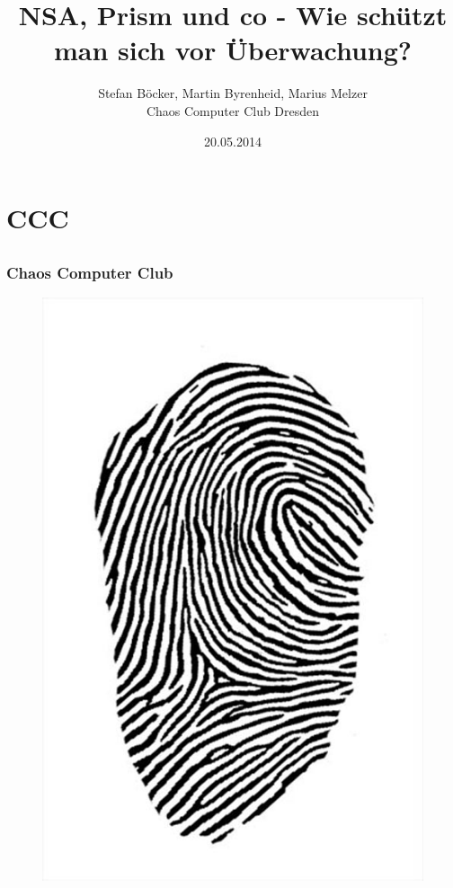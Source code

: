 \documentclass[12pt]{beamer}
\title{NSA, Prism und co - Wie schützt man sich vor Überwachung?}
\author{\small Stefan Böcker, Martin Byrenheid, Marius Melzer\\\large Chaos Computer Club Dresden}
\date{20.05.2014}
\begin{document}
\maketitle

\section{CCC}
\subsection{}

\begin{frame}
  \frametitle{Chaos Computer Club}
  \begin{figure}
    \includegraphics[height=0.7\textheight]{img/fingerabdruck.jpg}
  \end{figure}
\end{frame}
\end{document}
